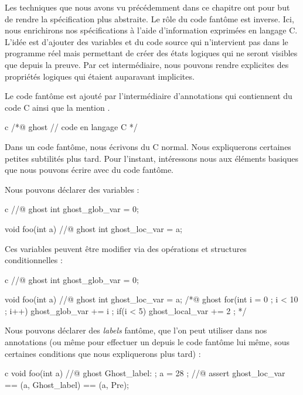 Les techniques que nous avons vu précédemment dans ce chapitre ont pour but de
rendre la spécification plus abstraite. Le rôle du code fantôme est inverse. Ici,
nous enrichirons nos spécifications à l'aide d'information exprimées
en langage C. L'idée est d'ajouter des variables et du code source qui
n'intervient pas dans le programme réel mais permettant de créer des états
logiques qui ne seront visibles que depuis la preuve. Par cet intermédiaire,
nous pouvons rendre explicites des propriétés logiques qui étaient auparavant
implicites.




Le code fantôme est ajouté par l'intermédiaire d'annotations qui contiennent
du code C ainsi que la mention .



\begin{CodeBlock}{c}
/*@
  ghost
  // code en langage C
*/
\end{CodeBlock}


Dans un code fantôme, nous écrivons du C normal. Nous expliquerons certaines
petites subtilités plus tard. Pour l'instant, intéressons nous aux éléments
basiques que nous pouvons écrire avec du code fantôme.


Nous pouvons déclarer des variables :


\begin{CodeBlock}{c}
//@ ghost int ghost_glob_var = 0;

void foo(int a){
  //@ ghost int ghost_loc_var = a;
}
\end{CodeBlock}


Ces variables peuvent être modifier via des opérations et structures
conditionnelles :


\begin{CodeBlock}{c}
//@ ghost int ghost_glob_var = 0;

void foo(int a){
  //@ ghost int ghost_loc_var = a;
  /*@ ghost
    for(int i = 0 ; i < 10 ; i++){
      ghost_glob_var += i ;
      if(i < 5) ghost_local_var += 2 ;
    }
  */
}
\end{CodeBlock}


Nous pouvons déclarer des \textit{labels} fantôme, que l'on peut utiliser dans
nos annotations (ou même pour effectuer un  depuis le code
fantôme lui même, sous certaines conditions que nous expliquerons plus tard) :


\begin{CodeBlock}{c}
void foo(int a){
  //@ ghost Ghost_label: ;
  a = 28 ;
  //@ assert ghost_loc_var == \at(a, Ghost_label) == \at(a, Pre);
}
\end{CodeBlock}


